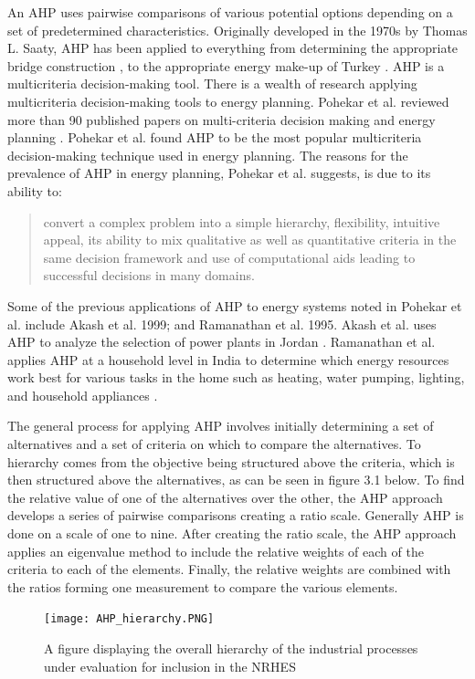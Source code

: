 \documentclass[12pt]{UIdahoMastersThesis}
\begin{document}
An AHP uses pairwise comparisons of various potential options depending on a set of predetermined characteristics. Originally developed in the 1970s by Thomas L. Saaty, AHP has been applied to everything from determining the appropriate bridge construction \cite{Pan2008}, to the appropriate energy make-up of Turkey\cite{Kahraman2010} \cite{Saaty1987}. AHP is a multicriteria decision-making tool. There is a wealth of research applying multicriteria decision-making tools to energy planning. Pohekar et al. reviewed more than 90 published papers on multi-criteria decision making and energy planning \cite{Pohekar2004}. Pohekar et al. found AHP to be the most popular multicriteria decision-making technique used in energy planning. The reasons for the prevalence of AHP in energy planning, Pohekar et al. suggests, is due to its ability to:
\begin{quote}
	convert a complex problem into a simple hierarchy, flexibility, intuitive appeal, its ability to mix qualitative as well as quantitative criteria in the same decision framework and use of computational aids leading to successful decisions in many domains.
 \end{quote}
Some of the previous applications of AHP to energy systems noted in Pohekar et al. include Akash et al.  1999; and Ramanathan et al. 1995. Akash et al. uses AHP to analyze the selection of power plants in Jordan \cite{Akash1999}.  Ramanathan et al. applies AHP at a household level in India to determine which energy resources work best for various tasks in the home such as heating, water pumping, lighting, and household appliances \cite{Ramanathan1995}.

The general process for applying AHP involves initially determining a set of alternatives and a set of criteria on which to compare the alternatives. To hierarchy comes from the objective being structured above the criteria, which is then structured above the alternatives, as can be seen in figure 3.1 below. To find the relative value of one of the alternatives over the other, the AHP approach develops a series of pairwise comparisons creating a ratio scale.  Generally AHP is done on a scale of one to nine. After creating the ratio scale, the AHP approach applies an eigenvalue method to include the relative weights of each of the criteria to each of  the elements. Finally, the relative weights are combined with the ratios forming one measurement to compare the various elements.

\begin{figure}[h!]
  \centering
  \texttt{[image: AHP\_hierarchy.PNG]}
  \caption{A figure displaying the overall hierarchy of the industrial processes under evaluation for inclusion in the NRHES}
\end{figure}
\end{document}
